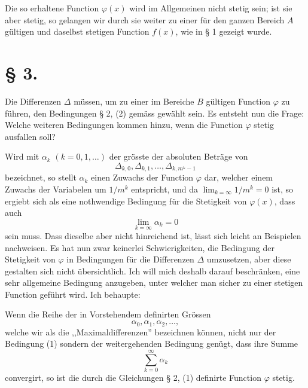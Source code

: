 \documentclass[11pt,a4paper]{article}
\begin{document}
Die so erhaltene Function $\varphi(x)$ wird im Allgemeinen nicht stetig sein; ist sie aber stetig, so gelangen wir durch sie weiter zu einer für den ganzen Bereich $A$ gültigen und daselbst stetigen Function $f(x)$, wie in § 1 gezeigt wurde.

\section*{§ 3.}

Die Differenzen $\Delta$ müssen, um zu einer im Bereiche $B$ gültigen Function $\varphi$ zu führen, den Bedingungen § 2, (2) gemäss gewählt sein. Es entsteht nun die Frage: Welche weiteren Bedingungen kommen hinzu, wenn die Function $\varphi$ stetig ausfallen soll?

Wird mit $\alpha_k$ $(k=0,1,\ldots)$ der grösste der absoluten Beträge von
\[
 \Delta_{k,0},\Delta_{k,1},\ldots,\Delta_{k,m^k-1}
\]
bezeichnet, so stellt $\alpha_k$ einen Zuwachs der Function $\varphi$ dar, welcher einem Zuwachs der Variabelen um $1/m^k$ entspricht, und da $\lim_{k=\infty}1/m^k=0$ ist, so ergiebt sich als eine nothwendige Bedingung für die Stetigkeit von $\varphi(x)$, dass auch
\begin{equation}
 \lim_{k=\infty}\alpha_k=0
\tag{1}
\end{equation}
sein muss. Dass dieselbe aber nicht hinreichend ist, lässt sich leicht an Beispielen nachweisen. Es hat nun zwar keinerlei Schwierigkeiten, die Bedingung der Stetigkeit von $\varphi$ in Bedingungen für die Differenzen $\Delta$ umzusetzen, aber diese gestalten sich nicht übersichtlich. Ich will mich deshalb darauf beschränken, eine sehr allgemeine Bedingung anzugeben, unter welcher man sicher zu einer stetigen Function geführt wird. Ich behaupte:

Wenn die Reihe der in Vorstehendem definirten Grössen
\[
 \alpha_0,\alpha_1,\alpha_2,\ldots,
\]
welche wir als die ,,Maximaldifferenzen'' bezeichnen können, nicht nur der Bedingung (1) sondern der weitergehenden Bedingung genügt, dass ihre Summe
\begin{equation}
 \sum_{k=0}^{\infty}\alpha_k
\tag{2}
\end{equation}
convergirt, so ist die durch die Gleichungen § 2, (1) definirte Function $\varphi$ stetig.
\end{document}
